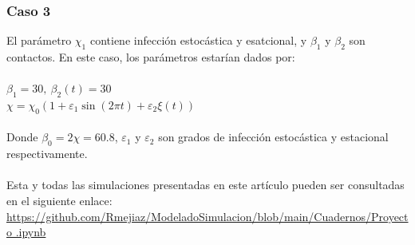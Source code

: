 \documentclass[conference]{IEEEtran}
\begin{document}
\subsubsection{Caso 3}

El parámetro $\chi_1$ contiene infección estocástica y esatcional, y $\beta_1$ y $\beta_2$ son contactos. En este caso, los parámetros estarían dados por:
\\\\
$\beta_1 = 30, \ \beta_2(t) = 30$
\\
$\chi = \chi_0(1 + \varepsilon_1 \sin(2 \pi t) + \varepsilon_2 \xi(t))$
\\\\
Donde $\beta_0 = 2\chi = 60.8$, $\varepsilon_1$ y $\varepsilon_2$ son grados de infección estocástica y estacional respectivamente.
\\\\
Esta y todas las simulaciones presentadas en este artículo pueden ser consultadas en 
el siguiente enlace: \href{https://github.com/Rmejiaz/ModeladoSimulacion/blob/main/Cuadernos/Proyecto.ipynb}{https://github.com/Rmejiaz/ModeladoSimulacion/blob/main/Cuadernos/Proyecto
.ipynb}
\end{document}
